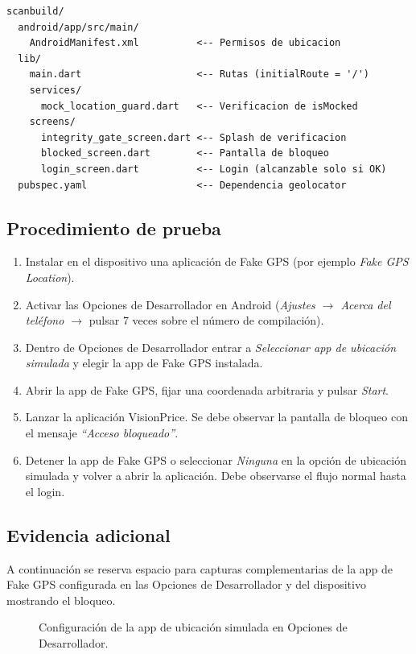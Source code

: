 \documentclass[12pt, a4paper]{article}
\begin{document}
\begin{lstlisting}[language={}, caption={Archivos clave de la solución anti Fake GPS}]
scanbuild/
  android/app/src/main/
    AndroidManifest.xml          <-- Permisos de ubicacion
  lib/
    main.dart                    <-- Rutas (initialRoute = '/')
    services/
      mock_location_guard.dart   <-- Verificacion de isMocked
    screens/
      integrity_gate_screen.dart <-- Splash de verificacion
      blocked_screen.dart        <-- Pantalla de bloqueo
      login_screen.dart          <-- Login (alcanzable solo si OK)
  pubspec.yaml                   <-- Dependencia geolocator
\end{lstlisting}

\subsection{Procedimiento de prueba}
\begin{enumerate}
    \item Instalar en el dispositivo una aplicación de Fake GPS
    (por ejemplo \textit{Fake GPS Location}).
    \item Activar las Opciones de Desarrollador en Android
    (\textit{Ajustes \(\rightarrow\) Acerca del teléfono \(\rightarrow\)} pulsar
    7 veces sobre el número de compilación).
    \item Dentro de Opciones de Desarrollador entrar a
    \textit{Seleccionar app de ubicación simulada} y elegir la app de
    Fake GPS instalada.
    \item Abrir la app de Fake GPS, fijar una coordenada arbitraria y
    pulsar \textit{Start}.
    \item Lanzar la aplicación VisionPrice. Se debe observar la
    pantalla de bloqueo con el mensaje \textit{``Acceso bloqueado''}.
    \item Detener la app de Fake GPS o seleccionar \textit{Ninguna} en
    la opción de ubicación simulada y volver a abrir la aplicación.
    Debe observarse el flujo normal hasta el login.
\end{enumerate}

\subsection{Evidencia adicional}
A continuación se reserva espacio para capturas complementarias de la
app de Fake GPS configurada en las Opciones de Desarrollador y del
dispositivo mostrando el bloqueo.

\begin{figure}[h]
    \centering
    \caption{Configuración de la app de ubicación simulada en Opciones de Desarrollador.}
    \label{fig:devopts}
\end{figure}
\end{document}
